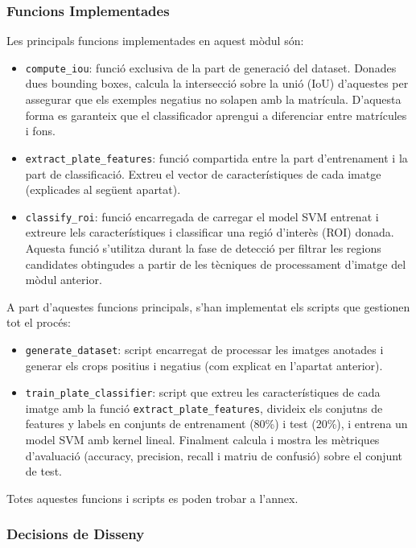 \subsubsection{Funcions Implementades}

Les principals funcions implementades en aquest mòdul són:
\begin{itemize}
    \item \texttt{compute\_iou}: funció exclusiva de la part de generació del dataset. Donades dues bounding boxes, calcula la intersecció sobre la unió (IoU) d'aquestes per assegurar que els exemples negatius no solapen amb la matrícula. D'aquesta forma es garanteix que el classificador aprengui a diferenciar entre matrícules i fons.
    \item \texttt{extract\_plate\_features}: funció compartida entre la part d'entrenament i la part de classificació. Extreu el vector de característiques de cada imatge (explicades al següent apartat).
    \item \texttt{classify\_roi}: funció encarregada de carregar el model SVM entrenat i extreure lels característiques i classificar una regió d'interès (ROI) donada. Aquesta funció s'utilitza durant la fase de detecció per filtrar les regions candidates obtingudes a partir de les tècniques de processament d'imatge del mòdul anterior. 
\end{itemize}

A part d'aquestes funcions principals, s'han implementat els scripts que gestionen tot el procés:

\begin{itemize}
    \item \texttt{generate\_dataset}: script encarregat de processar les imatges anotades i generar els crops positius i negatius (com explicat en l'apartat anterior).
    \item \texttt{train\_plate\_classifier}: script que extreu les característiques de cada imatge amb la funció \texttt{extract\_plate\_features}, divideix els conjutns de features y labels en conjunts de entrenament (80\%) i test (20\%),  i entrena un model SVM amb kernel lineal. Finalment calcula i mostra les mètriques d'avaluació (accuracy, precision, recall i matriu de confusió) sobre el conjunt de test.
\end{itemize}

Totes aquestes funcions i scripts es poden trobar a l'annex. 


\subsubsection{Decisions de Disseny}

